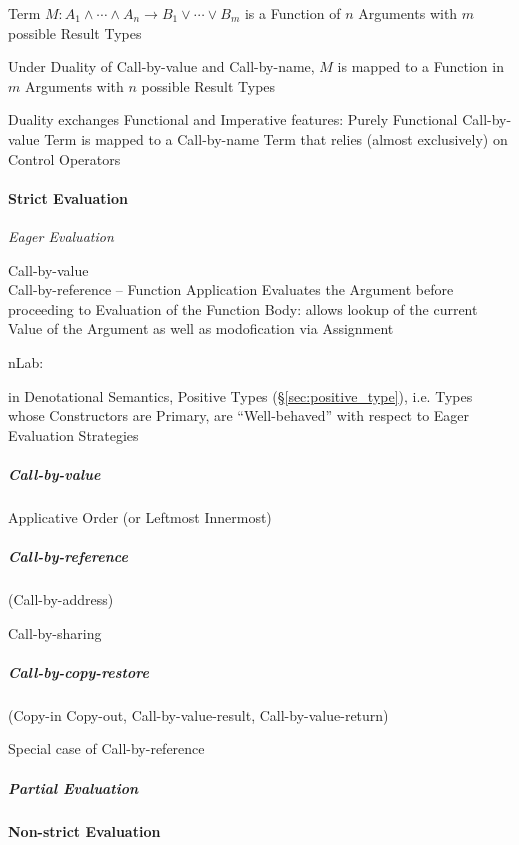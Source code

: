 Term $M : A_1 \wedge \cdots \wedge A_n \rightarrow B_1 \vee \cdots
\vee B_m$ is a Function of $n$ Arguments with $m$ possible Result
Types

Under Duality of Call-by-value and Call-by-name, $M$ is mapped to a
Function in $m$ Arguments with $n$ possible Result Types

Duality exchanges Functional and Imperative features: Purely
Functional Call-by-value Term is mapped to a Call-by-name Term that
relies (almost exclusively) on Control Operators %



\paragraph{Strict Evaluation}\label{sec:strict_evaluation}\hfill

\emph{Eager Evaluation}

Call-by-value \\
Call-by-reference -- Function Application Evaluates the Argument
before proceeding to Evaluation of the Function Body: allows lookup of
the current Value of the Argument as well as modofication via
Assignment

nLab:

in Denotational Semantics, Positive Types (\S\ref{sec:positive_type}),
i.e. Types whose Constructors are Primary, are ``Well-behaved'' with
respect to Eager Evaluation Strategies



\subparagraph{Call-by-value}\label{sec:call_by_value}\hfill

Applicative Order (or Leftmost Innermost)



\subparagraph{Call-by-reference}\label{sec:call_by_reference}\hfill

(Call-by-address)

Call-by-sharing



\subparagraph{Call-by-copy-restore}\label{sec:call_by_copy_restore}\hfill

(Copy-in Copy-out, Call-by-value-result, Call-by-value-return)

Special case of Call-by-reference



\subparagraph{Partial Evaluation}\label{sec:partial_evaluation}\hfill



\paragraph{Non-strict Evaluation}\label{sec:nonstrict_evaluation}\hfill

